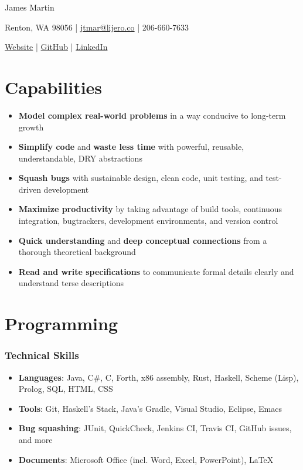 \documentclass[11pt]{article}
\begin{document}
\centerline{\LARGE James Martin}
\centerline{Renton, WA 98056 | \href{mailto:jtmar@lijero.co}{jtmar@lijero.co} | 206-660-7633}
\centerline{\href{https://lijero.co/}{Website} | \href{https://github.com/lijerom/}{GitHub} | \href{https://www.linkedin.com/in/jtmarlijero/}{LinkedIn}}

\section{Capabilities}
\begin{itemize}[noitemsep,nolistsep]
\item {\bf Model complex real-world problems} in a way conducive to long-term growth
\item {\bf Simplify code} and {\bf waste less time} with powerful, reusable, understandable, DRY abstractions
\item {\bf Squash bugs} with sustainable design, clean code, unit testing, and test-driven development
\item {\bf Maximize productivity} by taking advantage of build tools, continuous integration, bugtrackers, development environments, and version control
\item {\bf Quick understanding} and {\bf deep conceptual connections} from a thorough theoretical background
\item {\bf Read and write specifications} to communicate formal details clearly and understand terse descriptions
\end{itemize}

\section{Programming}
\subsubsection{Technical Skills}
\begin{itemize}[noitemsep,nolistsep]
\item {\bf Languages}: Java, C\#, C, Forth, x86 assembly, Rust, Haskell, Scheme (Lisp), Prolog, SQL, HTML, CSS
\item {\bf Tools}: Git, Haskell's Stack, Java's Gradle, Visual Studio, Eclipse, Emacs
\item {\bf Bug squashing}: JUnit, QuickCheck, Jenkins CI, Travis CI, GitHub issues, and more
\item {\bf Documents}: Microsoft Office (incl. Word, Excel, PowerPoint), \LaTeX
\end{itemize}
\end{document}
